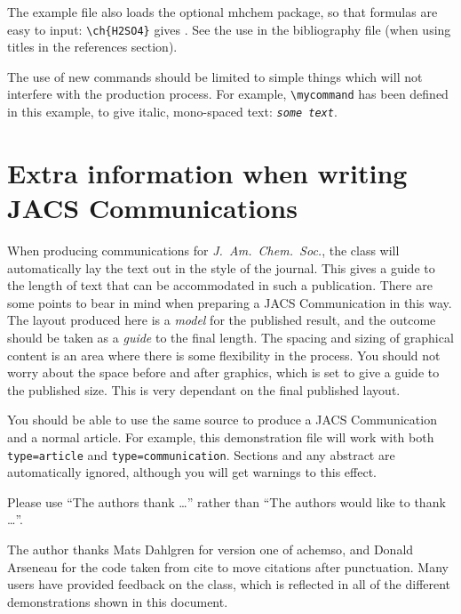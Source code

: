 \documentclass[journal=jacsat,manuscript=communication]{achemso}
\newcommand*\mycommand[1]{\texttt{\emph{#1}}}
\begin{document}
The example file also loads the optional \textsf{mhchem} package, so
that formulas are easy to input: \texttt{\textbackslash ch\{H2SO4\}}
gives .  See the use in the bibliography file (when using
titles in the references section).

The use of new commands should be limited to simple things which will
not interfere with the production process.  For example,
\texttt{\textbackslash mycommand} has been defined in this example,
to give italic, mono-spaced text: \mycommand{some text}.

\section{Extra information when writing JACS Communications}

When producing communications for \emph{J.~Am.\ Chem.\ Soc.}, the
class will automatically lay the text out in the style of the
journal. This gives a guide to the length of text that can be
accommodated in such a publication. There are some points to bear in
mind when preparing a JACS Communication in this way.  The layout
produced here is a \emph{model} for the published result, and the
outcome should be taken as a \emph{guide} to the final length. The
spacing and sizing of graphical content is an area where there is
some flexibility in the process.  You should not worry about the
space before and after graphics, which is set to give a guide to the
published size. This is very dependant on the final published layout.

You should be able to use the same source to produce a JACS
Communication and a normal article.  For example, this demonstration
file will work with both \texttt{type=article} and
\texttt{type=communication}. Sections and any abstract are
automatically ignored, although you will get warnings to this effect.

\begin{acknowledgement}

Please use ``The authors thank \ldots'' rather than ``The
authors would like to thank \ldots''.

The author thanks Mats Dahlgren for version one of \textsf{achemso},
and Donald Arseneau for the code taken from \textsf{cite} to move
citations after punctuation. Many users have provided feedback on the
class, which is reflected in all of the different demonstrations
shown in this document.

\end{acknowledgement}
\end{document}
